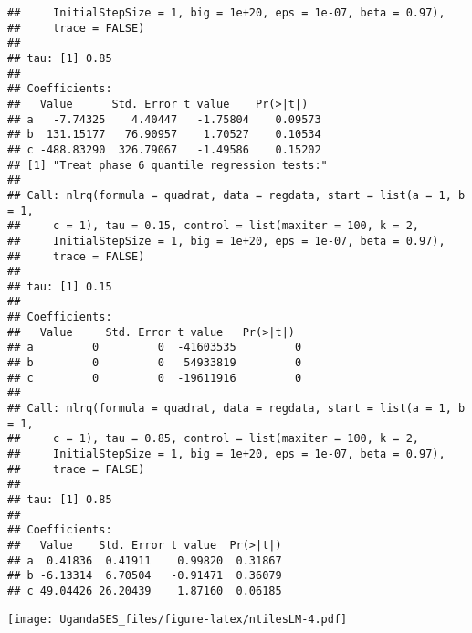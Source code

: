 \documentclass[
]{article}
\begin{document}
\begin{verbatim}
##     InitialStepSize = 1, big = 1e+20, eps = 1e-07, beta = 0.97), 
##     trace = FALSE)
## 
## tau: [1] 0.85
## 
## Coefficients:
##   Value      Std. Error t value    Pr(>|t|)  
## a   -7.74325    4.40447   -1.75804    0.09573
## b  131.15177   76.90957    1.70527    0.10534
## c -488.83290  326.79067   -1.49586    0.15202
## [1] "Treat phase 6 quantile regression tests:"
## 
## Call: nlrq(formula = quadrat, data = regdata, start = list(a = 1, b = 1, 
##     c = 1), tau = 0.15, control = list(maxiter = 100, k = 2, 
##     InitialStepSize = 1, big = 1e+20, eps = 1e-07, beta = 0.97), 
##     trace = FALSE)
## 
## tau: [1] 0.15
## 
## Coefficients:
##   Value     Std. Error t value   Pr(>|t|) 
## a         0         0  -41603535         0
## b         0         0   54933819         0
## c         0         0  -19611916         0
## 
## Call: nlrq(formula = quadrat, data = regdata, start = list(a = 1, b = 1, 
##     c = 1), tau = 0.85, control = list(maxiter = 100, k = 2, 
##     InitialStepSize = 1, big = 1e+20, eps = 1e-07, beta = 0.97), 
##     trace = FALSE)
## 
## tau: [1] 0.85
## 
## Coefficients:
##   Value    Std. Error t value  Pr(>|t|)
## a  0.41836  0.41911    0.99820  0.31867
## b -6.13314  6.70504   -0.91471  0.36079
## c 49.04426 26.20439    1.87160  0.06185
\end{verbatim}

\texttt{[image: UgandaSES\_files/figure-latex/ntilesLM-4.pdf]}
\end{document}
